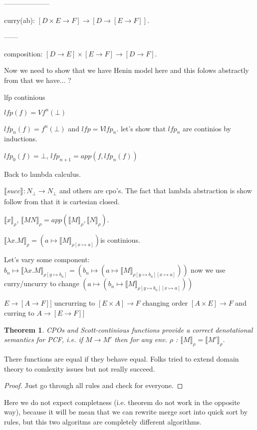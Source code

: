 \documentclass[a4paper,10pt]{book}
\newtheorem{theorem}{Theorem}
\newcommand{\sem}[2]{ \llbracket#1\rrbracket_{#2} }
\newcommand{\rarr}{ \rightarrow }
\begin{document}
 --------------------

 curry(ab): $[D\times E \rarr F] \rarr [D\rarr [E\rarr F]]$.
 
 ------

 composition: $[D\rarr E] \times [E \rarr F] \rarr [D\rarr F]$.
 
 
 Now we need to show that we have Henin model here and this folows abstractly from that we  have... ?
 
 lfp continious
 
 $lfp(f) = V f^n(\bot)$
 
 $lfp_n(f) = f^n(\bot)$ and $lfp = Vlfp_n$. let's show that $lfp_n$ are continios by inductions.
 
 $lfp_0(f) = \bot$, $lfp_{n+1} = app(f, lfp_n(f))$
 
 
 Back to lambda calculus.
 
 $\sem{succ}{} : N_\bot \rarr N_\bot $ and others are cpo's. The fact that lambda abstraction is
 show follow from that it is cartesian closed.
 
 $\sem{x}{\rho}$, $\sem{MN}{\rho} = app(\sem{M}{\rho}, \sem{N}{\rho})$.
 
 $\sem{\lambda x.M}{\rho} = (a \mapsto \sem{M}{\rho[x \mapsto a]}) $is continious.
 
 Let's vary some component: $b_n \mapsto \sem{\lambda x.M}{\rho[y\mapsto b_n]} = 
 (b_n \mapsto (a \mapsto \sem{M}{\rho[y\mapsto b_n][x \mapsto a]})) $ now we use curry/uncurry to change 
 $(a \mapsto (b_n \mapsto \sem{M}{\rho[y\mapsto b_n][x \mapsto a]}))$
 
 $E\rarr[A\rarr F]]$ uncrurring to $[E\times A]\rarr F$ changing order $[A\times E]\rarr F$ and 
 curring  to $A\rarr[E\rarr F]]$
 
\begin{theorem}
 CPOs and Scott-continious functions provide a correct denotational semantics for PCF,
 i.e. if $M\rarr M'$ then for any env. $\rho$ : $\sem{M}{\rho} = \sem{M'}{\rho}$.
\end{theorem}
There functions are equal if they behave equal. Folks tried to extend domain theory to 
comlexity issues but not really succeed.

\begin{proof}
 Just go through all rules and check for everyone.
\end{proof}

Here we do not expect completness (i.e. theorem do not work in the opposite way), because it will 
be mean that we can rewrite merge sort into quick sort by rules, but this two algoritms are completely
different algorithms.
\end{document}
